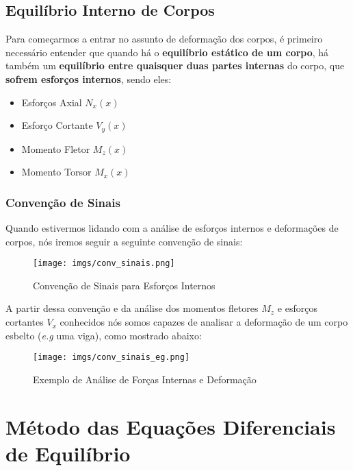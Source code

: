 \documentclass{article}
\begin{document}
        \newpage
        \subsection{Equilíbrio Interno de Corpos}
            Para começarmos a entrar no assunto de deformação dos corpos, é primeiro necessário entender que quando há o \textbf{equilíbrio estático de um corpo}, há também um \textbf{equilíbrio entre quaisquer duas
            partes internas} do corpo, que \textbf{sofrem esforços internos}, sendo eles:
            \begin{itemize}
                \item Esforços Axial $N_x(x)$
                \item Esforço Cortante $V_y(x)$
                \item Momento Fletor $M_z(x)$
                \item Momento Torsor $M_x(x)$
            \end{itemize}

            \subsubsection{Convenção de Sinais}
                Quando estivermos lidando com a análise de esforços internos e deformações de corpos, nós iremos seguir a seguinte convenção de sinais:
                \begin{figure}[h]
                    \centering
                    \texttt{[image: imgs/conv\_sinais.png]}
                    \caption{Convenção de Sinais para Esforços Internos}
                    \label{fig:conv_de_sinais_esf_intern}
                \end{figure}


                A partir dessa convenção e da análise dos momentos fletores $M_z$ e esforços cortantes $V_x$ conhecidos nós somos capazes de analisar a deformação de um corpo esbelto (\emph{e.g} uma viga),
                como mostrado abaixo:
                \begin{figure}[h]
                    \centering
                    \texttt{[image: imgs/conv\_sinais\_eg.png]}
                    \caption{Exemplo de Análise de Forças Internas e Deformação}
                \end{figure}

        \section{Método das Equações Diferenciais de Equilíbrio}
\end{document}
